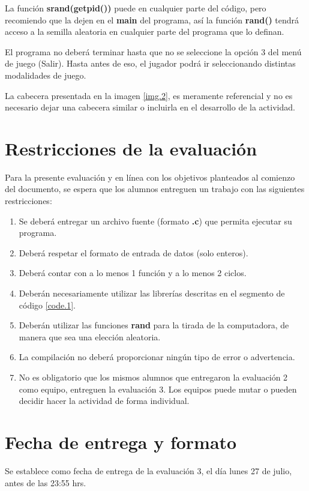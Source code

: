 \documentclass[]{article}
\begin{document}
    La función \textbf{srand(getpid())} puede en cualquier parte del código, pero recomiendo que la dejen en el \textbf{main} del programa, así la función \textbf{rand()} tendrá acceso a la semilla aleatoria en cualquier parte del programa que lo definan.

    El programa no deberá terminar hasta que no se seleccione la opción 3 del menú de juego (Salir). Hasta antes de eso, el jugador podrá ir seleccionando distintas modalidades de juego.

    La cabecera presentada en la imagen \ref{img.2}, es meramente referencial y no es necesario dejar una cabecera similar o incluirla en el desarrollo de la actividad.

    \section{Restricciones de la evaluación}
    Para la presente evaluación y en línea con los objetivos planteados al comienzo del documento, se espera que los alumnos entreguen un trabajo con las siguientes restricciones:

    \begin{enumerate}
        \item Se deberá entregar un archivo fuente (formato \textbf{.c}) que permita ejecutar su programa.
        \item Deberá respetar el formato de entrada de datos (solo enteros).
        \item Deberá contar con a lo menos 1 función y a lo menos 2 ciclos.
        \item Deberán necesariamente utilizar las librerías descritas en el segmento de código \ref{code.1}.
        \item Deberán utilizar las funciones \textbf{rand} para la tirada de la computadora, de manera que sea una elección aleatoria.
        \item La compilación no deberá proporcionar ningún tipo de error o advertencia.
        \item No es obligatorio que los mismos alumnos que entregaron la evaluación 2 como equipo, entreguen la evaluación 3. Los equipos puede mutar o pueden decidir hacer la actividad de forma individual.
    \end{enumerate}

    \section{Fecha de entrega y formato}
    Se establece como fecha de entrega de la evaluación 3, el día lunes 27 de julio, antes de las 23:55 hrs.
    
\end{document}
